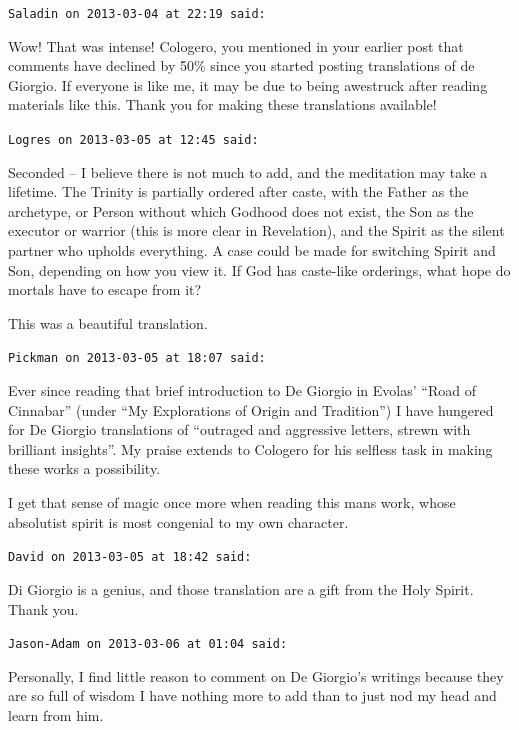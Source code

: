 \begin{footnotesize}
\begin{sffamily}
\texttt{Saladin on 2013-03-04 at 22:19 said:}

Wow! That was intense! Cologero, you mentioned in your earlier post that comments have declined by 50\% since you started posting translations of de Giorgio. If everyone is like me, it may be due to being awestruck after reading materials like this. Thank you for making these translations available!

\hfill

\texttt{Logres on 2013-03-05 at 12:45 said:}

Seconded -- I believe there is not much to add, and the meditation may take a lifetime. The Trinity is partially ordered after caste, with the Father as the archetype, or Person without which Godhood does not exist, the Son as the executor or warrior (this is more clear in Revelation), and the Spirit as the silent partner who upholds everything. A case could be made for switching Spirit and Son, depending on how you view it. If God has caste-like orderings, what hope do mortals have to escape from it?

This was a beautiful translation.

\hfill

\texttt{Pickman on 2013-03-05 at 18:07 said:}

Ever since reading that brief introduction to De Giorgio in Evolas' ``Road of Cinnabar'' (under ``My Explorations of Origin and Tradition'') I have hungered for De Giorgio translations of ``outraged and aggressive letters, strewn with brilliant insights''. My praise extends to Cologero for his selfless task in making these works a possibility.

I get that sense of magic once more when reading this mans work, whose absolutist spirit is most congenial to my own character.

\hfill

\texttt{David on 2013-03-05 at 18:42 said:}

Di Giorgio is a genius, and those translation are a gift from the Holy Spirit. Thank you.

\hfill

\texttt{Jason-Adam on 2013-03-06 at 01:04 said:}

Personally, I find little reason to comment on De Giorgio's writings because they are so full of wisdom I have nothing more to add than to just nod my head and learn from him.


\end{sffamily}
\end{footnotesize}
